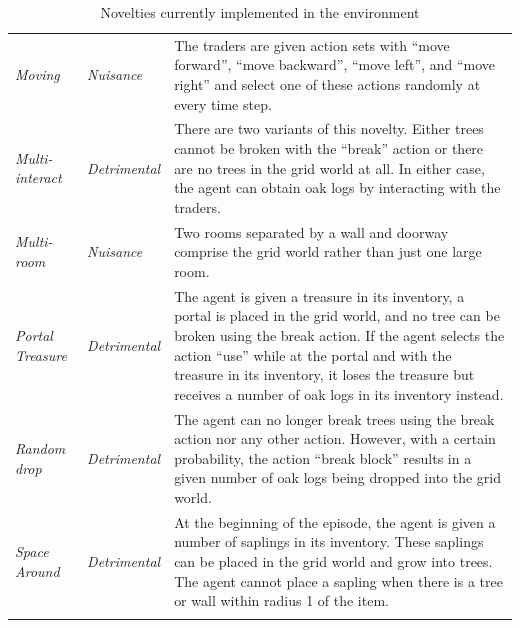 \begin{table}[!tb]
\begin{tabular}{p{2.2cm} p{2.2cm} p{9cm}}
    \emph{Moving} & \emph{Nuisance} & The traders are given action sets with ``move forward'', ``move backward'', ``move left'', and ``move right'' and select one of these actions randomly at every time step. \tabularnewline
    \arrayrulecolor{taupegray} \midrule
    
    \emph{Multi-interact} & \emph{Detrimental} & There are two variants of this novelty. Either trees cannot be broken with the ``break'' action or there are no trees in the grid world at all. In either case, the agent can obtain oak logs by interacting with the traders. \tabularnewline
    \arrayrulecolor{taupegray} \midrule
    
    \emph{Multi-room} & \emph{Nuisance} & Two rooms separated by a wall and doorway comprise the grid world rather than just one large room. \tabularnewline
    \arrayrulecolor{taupegray} \midrule
    
    \emph{Portal Treasure} & \emph{Detrimental} & The agent is given a treasure in its inventory, a portal is placed in the grid world, and no tree can be broken using the break action. If the agent selects the action ``use'' while at the portal and with the treasure in its inventory, it loses the treasure but receives a number of oak logs in its inventory instead. \tabularnewline
    \arrayrulecolor{taupegray} \midrule
    
    \emph{Random drop} & \emph{Detrimental} & The agent can no longer break trees using the break action nor any other action. However, with a certain probability, the action ``break block'' results in a given number of oak logs being dropped into the grid world. \tabularnewline
    \arrayrulecolor{taupegray} \midrule
    
    \emph{Space Around} & \emph{Detrimental} & At the beginning of the episode, the agent is given a number of saplings in its inventory. These saplings can be placed in the grid world and grow into trees. The agent cannot place a sapling when there is a tree or wall within radius 1 of the item. \tabularnewline
    \arrayrulecolor{taupegray} \bottomrule
    
    \end{tabular}
    \caption{Novelties currently implemented in the \NovelGym{} environment}
    \label{tab:rl_systemic_examples}
\end{table}